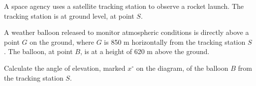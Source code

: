 \begin{question}
\noindent A space agency uses a satellite tracking station to observe a rocket launch. The tracking station is at ground level, at point $S$.

\noindent A weather balloon released to monitor atmospheric conditions is directly above a point $G$ on the ground, where $G$ is 850 m horizontally from the tracking station $S$. The balloon, at point $B$, is at a height of 620 m above the ground.

\begin{center}
\end{center}

\noindent Calculate the angle of elevation, marked $x^{\circ}$ on the diagram, of the balloon $B$ from the tracking station $S$.

\vspace{5cm}

\begin{flushright}
\end{flushright}
\end{question}
